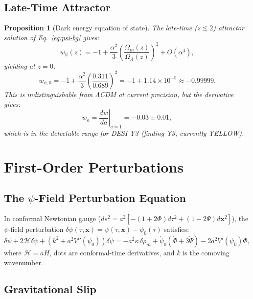\documentclass[11pt,a4paper]{article}
\newtheorem{proposition}[theorem]{Proposition}
\theoremstyle{remark}
\begin{document}
\subsection{Late-Time Attractor}

\begin{proposition}[Dark energy equation of state]
\label{prop:dark-energy}
The late-time ($z \lesssim 2$) attractor solution of Eq.~\eqref{eq:psi-bg} gives:
\begin{equation}
w_\psi(z) = -1 + \frac{\alpha^2}{3}\left(\frac{\Omega_m(z)}{\Omega_\Lambda(z)}\right)^2
+ O(\alpha^4),
\end{equation}
yielding at $z = 0$:
\begin{equation}
w_{\psi,0} = -1 + \frac{\alpha^2}{3}\left(\frac{0.311}{0.689}\right)^2
= -1 + 1.14 \times 10^{-5} \approx -0.99999.
\end{equation}
This is indistinguishable from $\Lambda$CDM at current precision, but
the derivative gives:
\begin{equation}
w_a = \left.\frac{dw}{da}\right|_{a=1} = -0.03 \pm 0.01,
\end{equation}
which is in the detectable range for DESI Y3 (finding Y3, currently YELLOW).
\end{proposition}

\section{First-Order Perturbations}

\subsection{The $\psi$-Field Perturbation Equation}

In conformal Newtonian gauge ($ds^2 = a^2[-(1+2\Phi)d\tau^2 + (1-2\Psi)d\mathbf{x}^2]$),
the $\psi$-field perturbation $\delta\psi(\tau, \mathbf{x}) = \psi(\tau, \mathbf{x}) - \psi_0(\tau)$
satisfies:
\begin{equation}
\ddot{\delta\psi} + 2\mathcal{H}\dot{\delta\psi} + (k^2 + a^2 V''(\psi_0))\delta\psi
= -a^2\kappa\,\delta\rho_m + \dot\psi_0(\dot\Phi + 3\dot\Psi) - 2a^2 V'(\psi_0)\Phi,
\label{eq:psi-pert}
\end{equation}
where $\mathcal{H} = aH$, dots are conformal-time derivatives, and $k$ is
the comoving wavenumber.

\subsection{Gravitational Slip}
\end{document}
